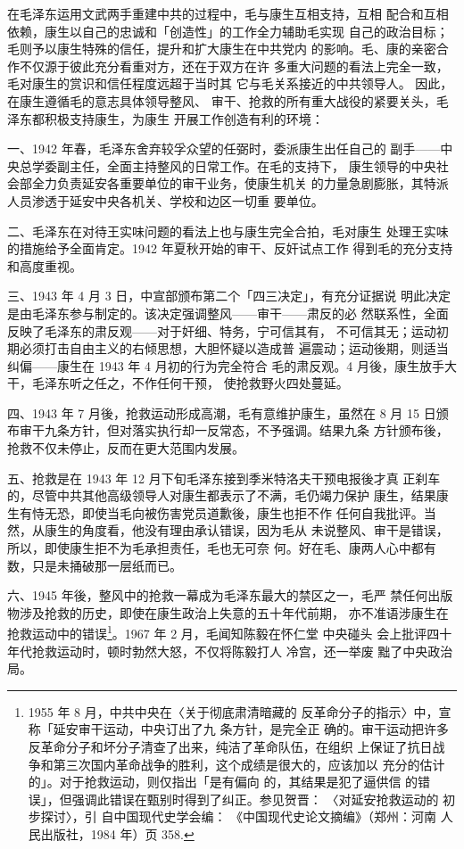 在毛泽东运用文武两手重建中共的过程中，毛与康生互相支持，互相
配合和互相依赖，康生以自己的忠诚和「创造性」的工作全力辅助毛实现
自己的政治目标；毛则予以康生特殊的信任，提升和扩大康生在中共党内
的影响。毛、康的亲密合作不仅源于彼此充分看重对方，还在于双方在许
多重大问题的看法上完全一致，毛对康生的赏识和信任程度远超于当时其
它与毛关系接近的中共领导人。
因此，
在康生遵循毛的意志具体领导整风、
审干、抢救的所有重大战役的紧要关头，毛泽东都积极支持康生，为康生
开展工作创造有利的环境：

一、1942 年春，毛泽东舍弃较孚众望的任弼时，委派康生出任自己的
副手——中央总学委副主任，全面主持整风的日常工作。在毛的支持下，
康生领导的中央社会部全力负责延安各重要单位的审干业务，使康生机关
的力量急剧膨胀，其特派人员渗透于延安中央各机关、学校和边区一切重
要单位。

二、毛泽东在对待王实味问题的看法上也与康生完全合拍，毛对康生
处理王实味的措施给予全面肯定。1942 年夏秋开始的审干、反奸试点工作
得到毛的充分支持和高度重视。

三、1943 年 4 月 3 日，中宣部颁布第二个「四三决定」，有充分证据说
明此决定是由毛泽东参与制定的。该决定强调整风——审干——肃反的必
然联系性，全面反映了毛泽东的肃反观——对于奸细、特务，宁可信其有，
不可信其无；运动初期必须打击自由主义的右倾思想，大胆怀疑以造成普
遍震动；运动後期，则适当纠偏——康生在 1943 年 4 月初的行为完全符合
毛的肃反观。4 月後，康生放手大干，毛泽东听之任之，不作任何干预，
使抢救野火四处蔓延。

四、1943 年 7 月後，抢救运动形成高潮，毛有意维护康生，虽然在 8 月
15 日颁布审干九条方针，但对落实执行却一反常态，不予强调。结果九条
方针颁布後，抢救不仅未停止，反而在更大范围内发展。

五、抢救是在 1943 年 12 月下旬毛泽东接到季米特洛夫干预电报後才真
正刹车的，尽管中共其他高级领导人对康生都表示了不满，毛仍竭力保护
康生，结果康生有恃无恐，即使当毛向被伤害党员道歉後，康生也拒不作
任何自我批评。当然，从康生的角度看，他没有理由承认错误，因为毛从
未说整风、审干是错误，所以，即使康生拒不为毛承担责任，毛也无可奈
何。好在毛、康两人心中都有数，只是未捅破那一层纸而已。

六、1945 年後，整风中的抢救一幕成为毛泽东最大的禁区之一，毛严 禁任何出版
物涉及抢救的历史，即使在康生政治上失意的五十年代前期， 亦不准语涉康生在
抢救运动中的错误\footnote{1955 年 8 月，中共中央在〈关于彻底肃清暗藏的
反革命分子的指示〉中，宣称「延安审干运动，中央订出了九 条方针，是完全正
确的。审干运动把许多反革命分子和坏分子清查了出来，纯洁了革命队伍，在组织
上保证了抗日战 争和第三次国内革命战争的胜利，这个成绩是很大的，应该加以
充分的估计的」。对于抢救运动，则仅指出「是有偏向 的，其结果是犯了逼供信
的错误」，但强调此错误在甄别时得到了纠正。参见贺晋： 〈对延安抢救运动的
初步探讨〉，引 自中国现代史学会编： 《中国现代史论文摘编》（郑州：河南
人民出版社，1984 年）页 358.  }。1967 年 2 月，毛闻知陈毅在怀仁堂 中央碰头
会上批评四十年代抢救运动时，顿时勃然大怒，不仅将陈毅打人 冷宫，还一举废
黜了中央政治局。

